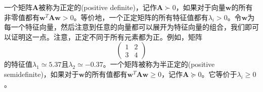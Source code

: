 一个矩阵$\boldsymbol{A}$被称为正定的(positive definite)，记作$\boldsymbol{A}\succ 0$，如果对于向量$\boldsymbol{w}$的所有非零值都有$\boldsymbol{w}^T\boldsymbol{Aw}>0$。等价地，一个正定矩阵的所有特征值都有$\lambda_i>0$。令$\boldsymbol{w}$为每一个特征向量，然后注意到任意的向量都可以展开为特征向量的组合，我们即可以证明这一点。注意，正定不同于所有元素都为正。例如，矩阵
\begin{equation}
	\begin{pmatrix}
		1&2\\
		3&4
	\end{pmatrix}
\end{equation}
的特征值$\lambda_1 \simeq 5.37$且$\lambda_2\simeq -0.37$。一个矩阵被称为半正定的(positive semidefinite)，如果对于$\boldsymbol{w}$的所有值都有$\boldsymbol{w}^T\boldsymbol{Aw}\geqslant 0$，记作$\boldsymbol{A}\succeq 0$。它等价于$\lambda_i \geqslant 0$。